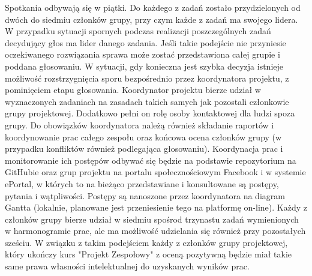 Spotkania odbywają się w piątki. Do każdego z zadań zostało przydzielonych od dwóch do siedmiu członków grupy, przy czym każde z zadań ma swojego lidera. W przypadku sytuacji spornych podczas realizacji poszczególnych zadań decydujący głos ma lider danego zadania. Jeśli takie podejście nie przyniesie oczekiwanego rozwiązania sprawa może zostać przedstawiona całej grupie i poddana głosowaniu. W sytuacji, gdy konieczna jest szybka decyzja istnieje możliwość rozstrzygnięcia sporu bezpośrednio przez koordynatora projektu, z pominięciem etapu głosowania. Koordynator projektu bierze udział w wyznaczonych zadaniach na zasadach takich samych jak pozostali członkowie grupy projektowej. Dodatkowo pełni on rolę osoby kontaktowej dla ludzi spoza grupy. Do obowiązków koordynatora należą również składanie raportów i koordynowanie prac całego zespołu oraz końcowa ocena członków grupy (w przypadku konfliktów również podlegająca głosowaniu). Koordynacja prac i monitorowanie ich postępów odbywać się będzie na podstawie repozytorium na GitHubie oraz grup projektu na portalu społecznościowym Facebook i w systemie ePortal, w których to na bieżąco przedstawiane i konsultowane są postępy, pytania i wątpliwości. Postępy są nanoszone przez koordynatora na diagram Gantta (lokalnie, planowane jest przeniesienie tego na platformę on-line). Każdy z członków grupy bierze udział w siedmiu spośrod trzynastu zadań wymienionych w harmonogramie prac, ale ma możliwość udzielania się również przy pozostałych sześciu. W związku z takim podejściem każdy z członków grupy projektowej, który ukończy kurs "Projekt Zespołowy" z oceną pozytywną będzie miał takie same prawa własności intelektualnej do uzyskanych wyników prac.
